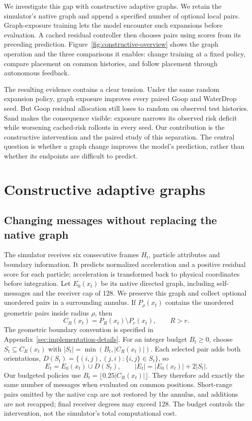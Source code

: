 We investigate this gap with constructive adaptive graphs. We retain the simulator's native graph and append a specified number of optional local pairs. Graph-exposure training lets the model encounter such expansions before evaluation. A cached residual controller then chooses pairs using scores from its preceding prediction. Figure~\ref{fig:constructive-overview} shows the graph operation and the three comparisons it enables: change training at a fixed policy, compare placement on common histories, and follow placement through autonomous feedback.

The resulting evidence contains a clear tension. Under the same random expansion policy, graph exposure improves every paired Goop and WaterDrop seed. But Goop residual allocation still loses to random on observed test histories. Sand makes the consequence visible: exposure narrows its observed risk deficit while worsening cached-risk rollouts in every seed. Our contribution is the constructive intervention and the paired study of this separation. The central question is whether a graph change improves the model's prediction, rather than whether its endpoints are difficult to predict.


\section{Constructive adaptive graphs}
\subsection{Changing messages without replacing the native graph}
The simulator receives six consecutive frames $H_t$, particle attributes and boundary information. It predicts normalized acceleration and a positive residual score for each particle; acceleration is transformed back to physical coordinates before integration. Let $E_0(x_t)$ be its native directed graph, including self-messages and the receiver cap of 128. We preserve this graph and collect optional unordered pairs in a surrounding annulus. If $P_\rho(x_t)$ contains the unordered geometric pairs inside radius $\rho$, then
\[
 C_R(x_t)=P_R(x_t)\setminus P_r(x_t),\qquad R>r.
\]
The geometric boundary convention is specified in Appendix~\ref{sec:implementation-details}.
For an integer budget $B_t\ge0$, choose $S_t\subseteq C_R(x_t)$ with $|S_t|=\min(B_t,|C_R(x_t)|)$. Each selected pair adds both orientations, $D(S_t)=\{(i,j),(j,i):\{i,j\}\in S_t\}$, so
\begin{equation}
 E_t=E_0(x_t)\cup D(S_t),\qquad |E_t|=|E_0(x_t)|+2|S_t|.
 \label{eq:budget}
\end{equation}
Our budgeted policies use $B_t=\lfloor0.25|C_R(x_t)|\rfloor$. They therefore add exactly the same number of messages when evaluated on common positions. Short-range pairs omitted by the native cap are not restored by the annulus, and additions are not recapped; final receiver degrees may exceed 128. The budget controls the intervention, not the simulator's total computational cost.

